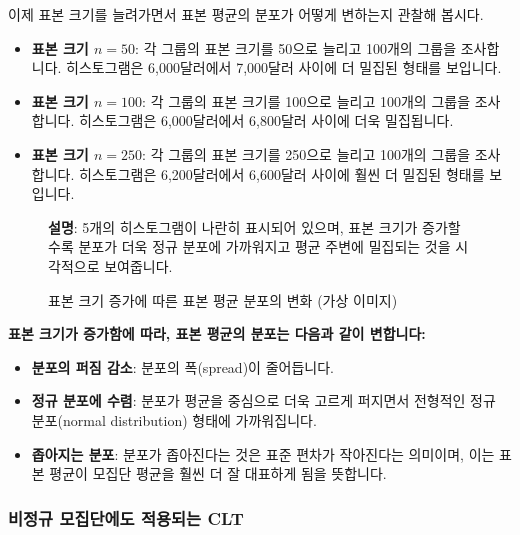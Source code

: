 \documentclass[11pt,a4paper]{article}
\theoremstyle{definition}
\begin{document}
이제 표본 크기를 늘려가면서 표본 평균의 분포가 어떻게 변하는지 관찰해 봅시다.

\begin{itemize}
    \item \textbf{표본 크기 $n=50$}: 각 그룹의 표본 크기를 50으로 늘리고 100개의 그룹을 조사합니다. 히스토그램은 6,000달러에서 7,000달러 사이에 더 밀집된 형태를 보입니다.
    \item \textbf{표본 크기 $n=100$}: 각 그룹의 표본 크기를 100으로 늘리고 100개의 그룹을 조사합니다. 히스토그램은 6,000달러에서 6,800달러 사이에 더욱 밀집됩니다.
    \item \textbf{표본 크기 $n=250$}: 각 그룹의 표본 크기를 250으로 늘리고 100개의 그룹을 조사합니다. 히스토그램은 6,200달러에서 6,600달러 사이에 훨씬 더 밀집된 형태를 보입니다.
\end{itemize}

\begin{figure}[h!]
    \centering
    \caption{표본 크기 증가에 따른 표본 평균 분포의 변화 (가상 이미지)}
    \label{fig:all_hists}
    \textbf{설명}: 5개의 히스토그램이 나란히 표시되어 있으며, 표본 크기가 증가할수록 분포가 더욱 정규 분포에 가까워지고 평균 주변에 밀집되는 것을 시각적으로 보여줍니다.
\end{figure}

\begin{summarybox}[CLT의 핵심 관찰 결과]
\textbf{표본 크기가 증가함에 따라, 표본 평균의 분포는 다음과 같이 변합니다:}
\begin{itemize}
    \item \textbf{분포의 퍼짐 감소}: 분포의 폭(spread)이 줄어듭니다.
    \item \textbf{정규 분포에 수렴}: 분포가 평균을 중심으로 더욱 고르게 퍼지면서 전형적인 정규 분포(normal distribution) 형태에 가까워집니다.
    \item \textbf{좁아지는 분포}: 분포가 좁아진다는 것은 표준 편차가 작아진다는 의미이며, 이는 표본 평균이 모집단 평균을 훨씬 더 잘 대표하게 됨을 뜻합니다.
\end{itemize}
\end{summarybox}

\subsubsection*{비정규 모집단에도 적용되는 CLT}
\end{document}
